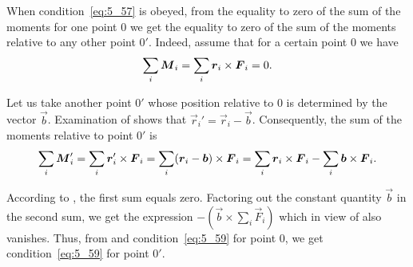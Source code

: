 When condition~\eqref{eq:5_57} is obeyed, from the equality to zero of the sum of the moments for one point $0$ we get the equality to zero of the sum of the moments relative to any other point $0'$. Indeed, assume that for a certain point $0$ we have
\begin{equation}\label{eq:5_59}
	\sum_i\boldsymbol{M}_{i} = \sum_i\boldsymbol{r}_{i}\times\boldsymbol{F}_{i} = 0.
\end{equation}

\noindent
Let us take another point $0'$ whose position relative to $0$ is determined by the vector $\vec{b}$. Examination of  shows that $\vec{r}_i'=\vec{r}_i-\vec{b}$. Consequently, the sum of the moments relative to point $0'$ is
\begin{equation*}
	\sum_i\boldsymbol{M}_{i}' = \sum_i \boldsymbol{r}_i'\times\boldsymbol{F}_i = \sum_i (\boldsymbol{r}_i-\boldsymbol{b})\times\boldsymbol{F}_i = \sum_i\boldsymbol{r}_{i}\times\boldsymbol{F}_{i} - \sum_i\boldsymbol{b}\times\boldsymbol{F}_i.
\end{equation*}

\noindent
According to , the first sum equals zero. Factoring out the constant quantity $\vec{b}$ in the second sum, we get the expression $-\left(\vec{b}\times\sum_i\vec{F}_i\right)$ which in view of  also vanishes. Thus, from  and condition~\eqref{eq:5_59} for point $0$, we get condition~\eqref{eq:5_59} for point $0'$.

